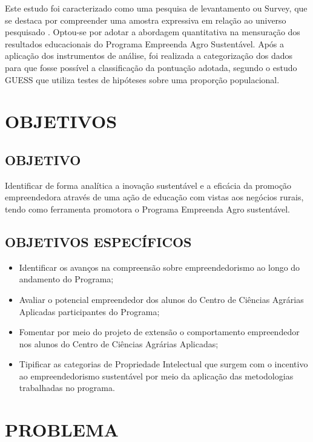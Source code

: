Este estudo foi caracterizado como uma pesquisa de levantamento ou Survey, que se destaca por compreender uma amostra expressiva em relação ao universo pesquisado \cite{freitas_o_2000}. Optou-se por adotar a abordagem quantitativa na mensuração dos resultados educacionais do Programa Empreenda Agro Sustentável. Após a aplicação dos instrumentos de análise, foi realizada a categorização dos dados para que fosse possível a classificação da pontuação adotada, segundo o estudo GUESS \cite{meoli_how_2019} que utiliza testes de hipóteses sobre uma proporção populacional. 


\newpage

\section{OBJETIVOS}

\subsection{OBJETIVO}

Identificar de forma analítica a inovação sustentável e a eficácia da promoção empreendedora através de uma ação de educação com vistas aos negócios rurais, tendo como ferramenta promotora o Programa Empreenda Agro sustentável.


\subsection{OBJETIVOS ESPECÍFICOS}

\begin{itemize}
\item{Identificar os avanços na compreensão sobre empreendedorismo ao longo do andamento do Programa;}
\item {Avaliar o potencial empreendedor dos alunos do Centro de Ciências Agrárias Aplicadas participantes do Programa;}
\item {Fomentar por meio do projeto de extensão o comportamento empreendedor nos alunos do Centro de Ciências Agrárias Aplicadas;}
\item {Tipificar as categorias de Propriedade Intelectual que surgem com o incentivo ao empreendedorismo sustentável por meio da aplicação das metodologias trabalhadas no programa.}
\end{itemize}


\section{PROBLEMA}

